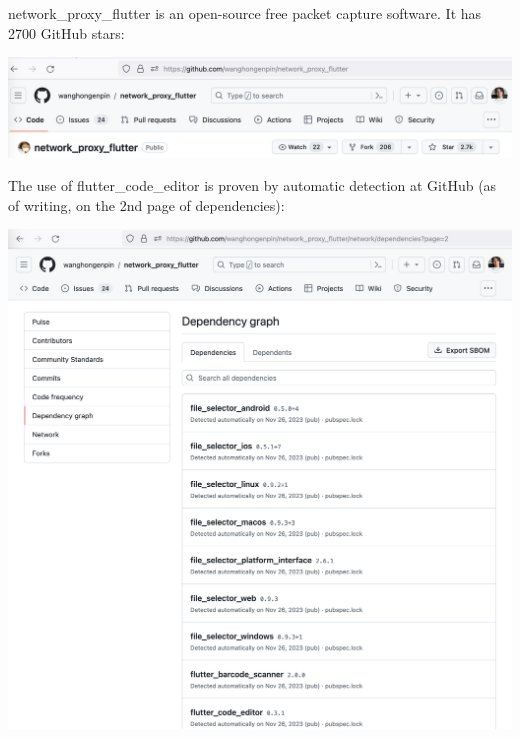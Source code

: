 
network\_proxy\_flutter is an open-source free packet capture software.
It has 2700 GitHub stars:

\begin{center}
    \includegraphics[width=\textwidth]{stars}
\end{center}

The use of flutter\_code\_editor is proven by automatic detection at GitHub
(as of writing, on the 2nd page of dependencies):

\begin{center}
    \includegraphics[width=\textwidth]{dependencies}
\end{center}

\pagebreak
